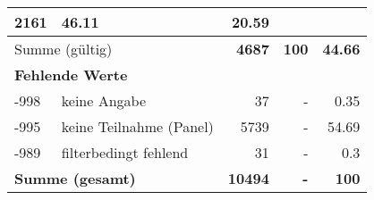 \begin{longtable}{lXrrr}
       \num{2161} &
       \num[round-mode=places,round-precision=2]{46.11} &
         \num[round-mode=places,round-precision=2]{20.59} \\
     \midrule
     \multicolumn{2}{l}{Summe (gültig)} &
       \textbf{\num{4687}} &
     \textbf{\num{100}} &
       \textbf{\num[round-mode=places,round-precision=2]{44.66}} \\
     \multicolumn{5}{l}{\textbf{Fehlende Werte}}\\
       -998 &
       keine Angabe &
         \num{37} &
        - &
         \num[round-mode=places,round-precision=2]{0.35} \\
       -995 &
       keine Teilnahme (Panel) &
         \num{5739} &
        - &
         \num[round-mode=places,round-precision=2]{54.69} \\
       -989 &
       filterbedingt fehlend &
         \num{31} &
        - &
         \num[round-mode=places,round-precision=2]{0.3} \\
     \midrule
     \multicolumn{2}{l}{\textbf{Summe (gesamt)}} &
          \textbf{\num{10494}} &
        \textbf{-} &
        \textbf{\num{100}} \\
     \bottomrule
     \end{longtable}
     
